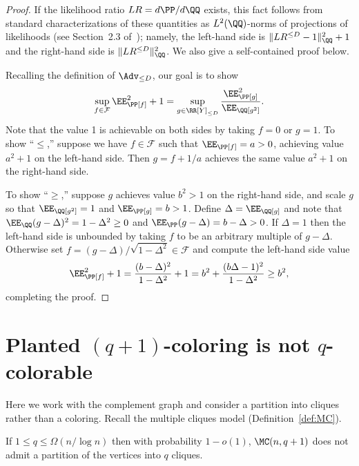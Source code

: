\documentclass{article}
\begin{document}
\begin{proof}
If the likelihood ratio $LR = d\PP/d\QQ$ exists, this fact follows from standard characterizations of these quantities as $L^2(\QQ)$-norms of projections of likelihoods (see Section~2.3 of~\cite{hopkins-thesis}); namely, the left-hand side is $\|LR^{\le D}-1\|_\QQ^2+1$ and the right-hand side is $\|LR^{\le D}\|_\QQ^2$. We also give a self-contained proof below.

Recalling the definition of $\Adv_{\le D}$, our goal is to show
\[ \sup_{f \in \mathcal{F}} \EE_\PP[f]^2 + 1 = \sup_{g \in \RR[Y]_{\le D}} \frac{\EE_\PP[g]^2}{\EE_\QQ[g^2]}. \]
Note that the value 1 is achievable on both sides by taking $f = 0$ or $g = 1$. To show ``$\le$,'' suppose we have $f \in \mathcal{F}$ such that $\EE_\PP[f] = a > 0$, achieving value $a^2+1$ on the left-hand side. Then $g = f + 1/a$ achieves the same value $a^2+1$ on the right-hand side.

To show ``$\ge$,'' suppose $g$ achieves value $b^2 > 1$ on the right-hand side, and scale $g$ so that $\EE_\QQ[g^2] = 1$ and $\EE_\PP[g] = b > 1$. Define $\Delta = \EE_\QQ[g]$ and note that $\EE_\QQ(g-\Delta)^2 = 1 - \Delta^2 \ge 0$ and $\EE_\PP(g-\Delta) = b - \Delta > 0$. If $\Delta = 1$ then the left-hand side is unbounded by taking $f$ to be an arbitrary multiple of $g-\Delta$. Otherwise set $f = (g-\Delta)/\sqrt{1-\Delta^2} \in \mathcal{F}$ and compute the left-hand side value
\[ \EE_\PP[f]^2 + 1 = \frac{(b-\Delta)^2}{1-\Delta^2} + 1 = b^2 + \frac{(b\Delta-1)^2}{1-\Delta^2} \ge b^2, \]
completing the proof.
\end{proof}






\appendix

\section{Planted $(q+1)$-coloring is not $q$-colorable}
\label{app:coloring}

Here we work with the complement graph and consider a partition into cliques rather than a coloring. Recall the multiple cliques model (Definition~\ref{def:MC}).

\begin{proposition}
If $1 \le q \le \Omega(n/\log n)$ then with probability $1-o(1)$, $\MC(n,q+1)$ does not admit a partition of the vertices into $q$ cliques.
\end{proposition}
\end{document}
